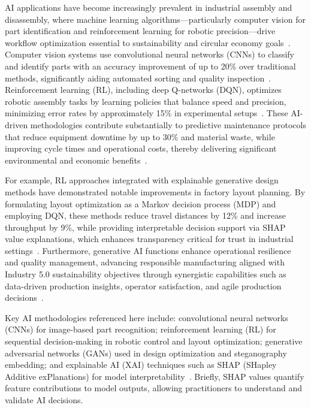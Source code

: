 \documentclass[sigconf]{acmart}
\begin{document}
AI applications have become increasingly prevalent in industrial assembly and disassembly, where machine learning algorithms—particularly computer vision for part identification and reinforcement learning for robotic precision—drive workflow optimization essential to sustainability and circular economy goals~\cite{ref6,ref9,ref44}. Computer vision systems use convolutional neural networks (CNNs) to classify and identify parts with an accuracy improvement of up to 20\% over traditional methods, significantly aiding automated sorting and quality inspection~\cite{ref44}. Reinforcement learning (RL), including deep Q-networks (DQN), optimizes robotic assembly tasks by learning policies that balance speed and precision, minimizing error rates by approximately 15\% in experimental setups~\cite{ref9}. These AI-driven methodologies contribute substantially to predictive maintenance protocols that reduce equipment downtime by up to 30\% and material waste, while improving cycle times and operational costs, thereby delivering significant environmental and economic benefits~\cite{ref7,ref13,ref36}.

For example, RL approaches integrated with explainable generative design methods have demonstrated notable improvements in factory layout planning. By formulating layout optimization as a Markov decision process (MDP) and employing DQN, these methods reduce travel distances by 12\% and increase throughput by 9\%, while providing interpretable decision support via SHAP value explanations, which enhances transparency critical for trust in industrial settings~\cite{ref9}. Furthermore, generative AI functions enhance operational resilience and quality management, advancing responsible manufacturing aligned with Industry 5.0 sustainability objectives through synergistic capabilities such as data-driven production insights, operator satisfaction, and agile production decisions~\cite{ref6}. 

Key AI methodologies referenced here include: convolutional neural networks (CNNs) for image-based part recognition; reinforcement learning (RL) for sequential decision-making in robotic control and layout optimization; generative adversarial networks (GANs) used in design optimization and steganography embedding; and explainable AI (XAI) techniques such as SHAP (SHapley Additive exPlanations) for model interpretability~\cite{ref6,ref7,ref9,ref44}. Briefly, SHAP values quantify feature contributions to model outputs, allowing practitioners to understand and validate AI decisions.
\end{document}
